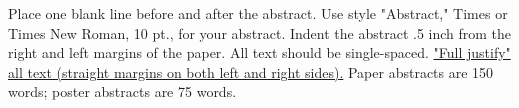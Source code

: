\documentclass{article}
\title{     }
\author{     }
\date{     }
\begin{document}
Place one blank line before and after the abstract. Use style "Abstract," Times or Times New Roman, 10 pt., for your abstract. Indent the abstract .5 inch from the right and left margins of the paper. All text should be single-spaced. \uline{"Full justify" all text (straight margins
on both left and right sides).} Paper abstracts are 150 words; poster abstracts are 75 words.
\end{document}
